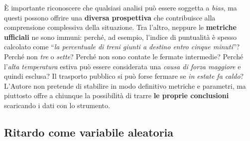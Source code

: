 \documentclass[12pt,a4paper,italian]{report}
\begin{document}
È importante riconoscere che qualsiasi analisi può essere soggetta a
\textit{bias}, ma questi possono offrire una \textbf{diversa
    prospettiva} che contribuisce alla comprensione complessiva della
situazione.  Tra l'altro, neppure le \textbf{metriche ufficiali} ne
sono immuni: perché, ad esempio, l'indice di puntualità è spesso
calcolato come ``\textit{la percentuale di treni giunti a destino
    entro cinque minuti}''?  Perché non \textit{tre} o \textit{sette}?
Perché non sono contate le fermate intermedie?  Perché l'\textit{alta
    temperatura} estiva può essere considerata una \textit{causa di
    forza maggiore} e quindi esclusa?  Il trasporto pubblico si può
forse fermare se \textit{in estate fa caldo}?  L'Autore non pretende
di stabilire in modo definitivo metriche e parametri, ma piuttosto
offre a chiunque la possibilità di trarre \textbf{le proprie
    conclusioni} scaricando i dati con lo strumento.

\subsection{Ritardo come variabile aleatoria}
\label{var_aleatoria}
\end{document}
